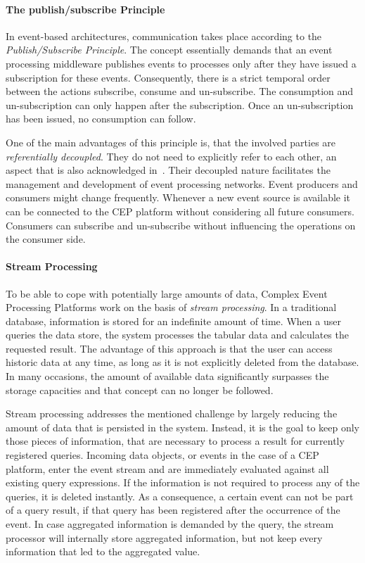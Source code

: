 \paragraph{The publish/subscribe Principle}
In event-based architectures, communication takes place according to the \textit{Publish/Subscribe Principle}.
The concept essentially demands that an event processing middleware publishes events to processes only after they have issued a subscription for these events.
Consequently, there is a strict temporal order between the actions subscribe, consume and un-subscribe. The consumption and un-subscription can only happen after the subscription. Once an un-subscription has been issued, no consumption can follow.~\cite{tanenbaum:2007}

One of the main advantages of this principle is, that the involved parties are \textit{referentially decoupled}. They do not need to explicitly refer to each other, an aspect that is also acknowledged in~\cite{evtprocessing}.
Their decoupled nature facilitates the management and development of event processing networks. Event producers and consumers might change frequently.
Whenever a new event source is available it can be connected to the CEP platform without considering all future consumers. Consumers can subscribe and un-subscribe without influencing the operations on the consumer side.


\paragraph{Stream Processing}
To be able to cope with potentially large amounts of data, Complex Event Processing Platforms work on the basis of \textit{stream processing}.
In a traditional database, information is stored for an indefinite amount of time. When a user queries the data store, the system processes the tabular data and calculates the requested result. 
The advantage of this approach is that the user can access historic data at any time, as long as it is not explicitly deleted from the database.
In many occasions, the amount of available data significantly surpasses the storage capacities and that concept can no longer be followed.

Stream processing addresses the mentioned challenge by largely reducing the amount of data that is persisted in the system. Instead, it is the goal to keep only those pieces of information, that are necessary to process a result for currently registered queries.
Incoming data objects, or events in the case of a CEP platform, enter the event stream and are immediately evaluated against all existing query expressions. If the information is not required to process any of the queries, it is deleted instantly.
As a consequence, a certain event can not be part of a query result, if that query has been registered after the occurrence of the event.
In case aggregated information is demanded by the query, the stream processor will internally store aggregated information, but not keep every information that led to the aggregated value.~\cite{streamprocessing} 

